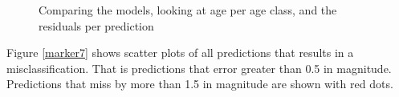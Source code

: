 \documentclass[10pt,letterpaper]{article}
\begin{document}
\begin{figure}
  \caption{\label{ref_label_overall}Comparing the models, looking at age per age class, and the residuals per prediction}
  \label{marker6}
\end{figure}

Figure \ref{marker7} shows scatter plots of all predictions that results in a misclassification. That is predictions
that error greater than 0.5 in magnitude. Predictions that miss by more than 1.5 in magnitude are shown with red dots.
\end{document}
